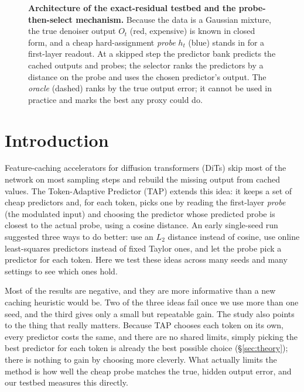 \documentclass[10pt,twocolumn]{article}
\begin{document}
\begin{figure}[t]
{}
\caption{\textbf{Architecture of the exact-residual testbed and the probe-then-select
mechanism.} Because the data is a Gaussian mixture, the true denoiser output $O_t$ (red,
expensive) is known in closed form, and a cheap hard-assignment \emph{probe} $h_t$ (blue)
stands in for a first-layer readout. At a skipped step the predictor bank predicts the cached
outputs and probes; the selector ranks the predictors by a distance on the probe and uses
the chosen predictor's output. The \emph{oracle} (dashed) ranks by the true output error; it
cannot be used in practice and marks the best any proxy could do.}
\label{fig:arch}
\end{figure}

\section{Introduction}
Feature-caching accelerators for diffusion transformers (DiTs)\cite{peebles2023dit} skip
most of the network on most sampling steps and rebuild the missing output from cached
values\cite{ma2024deepcache,selvaraju2024fora}. The Token-Adaptive Predictor (TAP) extends
this idea: it keeps a set of cheap predictors and, for each token, picks one by reading the
first-layer \emph{probe} (the modulated input) and choosing the predictor whose predicted
probe is closest to the actual probe, using a cosine distance. An early single-seed run
suggested three ways to do better: use an $L_2$ distance instead of cosine, use online
least-squares predictors instead of fixed Taylor ones, and let the probe pick a predictor
for each token. Here we test these ideas across many seeds and many settings to see which
ones hold.

Most of the results are negative, and they are more informative than a new caching heuristic
would be. Two of the three ideas fail once we use more than one seed, and the third gives
only a small but repeatable gain. The study also points to the thing that really matters. Because
TAP chooses each token on its own, every predictor costs the same, and there are no shared
limits, simply picking the best predictor for each token is already the best possible choice
(\S\ref{sec:theory}); there is nothing to gain by choosing more cleverly. What actually
limits the method is how well the cheap probe matches the true, hidden output error, and our
testbed measures this directly.
\end{document}
